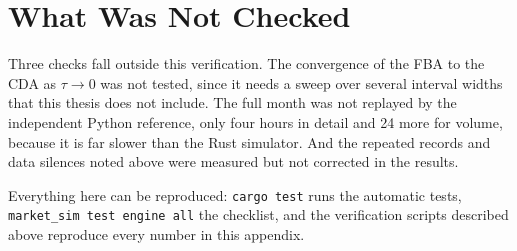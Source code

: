\section{What Was Not Checked}
\label{sec:testlimits}

Three checks fall outside this verification. The convergence of the FBA to the CDA
as $\tau \to 0$ was not tested, since it needs a sweep over several interval widths
that this thesis does not include. The full month was not replayed by the
independent Python reference, only four hours in detail and 24 more for volume,
because it is far slower than the Rust simulator. And the repeated records and data
silences noted above were measured but not corrected in the results.

Everything here can be reproduced: \texttt{cargo test} runs the automatic tests,
\texttt{market\_sim test engine all} the checklist, and the verification scripts
described above reproduce every number in this appendix.
